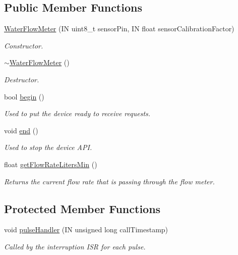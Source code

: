 \subsection*{Public Member Functions}
\begin{DoxyCompactItemize}
\item 
\hyperlink{class_easyuino_1_1_water_flow_meter_a51374e5ffa6327028f4d5fe730083672}{Water\+Flow\+Meter} (IN uint8\+\_\+t sensor\+Pin, IN float sensor\+Calibration\+Factor)
\begin{DoxyCompactList}\small\item\em Constructor. \end{DoxyCompactList}\item 
\mbox{\label{class_easyuino_1_1_water_flow_meter_ab9f6129be636d43c426eed5b5b42e088}} 
\hyperlink{class_easyuino_1_1_water_flow_meter_ab9f6129be636d43c426eed5b5b42e088}{$\sim$\+Water\+Flow\+Meter} ()
\begin{DoxyCompactList}\small\item\em Destructor. \end{DoxyCompactList}\item 
bool \hyperlink{class_easyuino_1_1_water_flow_meter_a400c25b10a7cde45c623805546d071cd}{begin} ()
\begin{DoxyCompactList}\small\item\em Used to put the device ready to receive requests. \end{DoxyCompactList}\item 
void \hyperlink{class_easyuino_1_1_water_flow_meter_a47024d4da9568e42743a875c08c33121}{end} ()
\begin{DoxyCompactList}\small\item\em Used to stop the device A\+PI. \end{DoxyCompactList}\item 
float \hyperlink{class_easyuino_1_1_water_flow_meter_ab8d3afb56987644486dcf6e17457269d}{get\+Flow\+Rate\+Liters\+Min} ()
\begin{DoxyCompactList}\small\item\em Returns the current flow rate that is passing through the flow meter. \end{DoxyCompactList}\end{DoxyCompactItemize}
\subsection*{Protected Member Functions}
\begin{DoxyCompactItemize}
\item 
void \hyperlink{class_easyuino_1_1_water_flow_meter_a9f9b39b7961175f027dad4fe75271569}{pulse\+Handler} (IN unsigned long call\+Timestamp)
\begin{DoxyCompactList}\small\item\em Called by the interruption I\+SR for each pulse. \end{DoxyCompactList}\end{DoxyCompactItemize}
